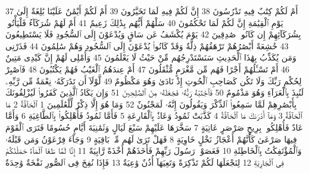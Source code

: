 {\tiny\colorbox{cl_aya}{37}} أَمْ لَكُمْ كِتَٰبٌ فِيهِ تَدْرُسُونَ
{\tiny\colorbox{cl_aya}{38}} إِنَّ لَكُمْ فِيهِ لَمَا تَخَيَّرُونَ
{\tiny\colorbox{cl_aya}{39}} أَمْ لَكُمْ أَيْمَٰنٌ عَلَيْنَا بَٰلِغَةٌ إِلَىٰ يَوْمِ ٱلْقِيَٰمَةِ إِنَّ لَكُمْ لَمَا تَحْكُمُونَ
{\tiny\colorbox{cl_aya}{40}} سَلْهُمْ أَيُّهُم بِذَٰلِكَ زَعِيمٌ
{\tiny\colorbox{cl_aya}{41}} أَمْ لَهُمْ شُرَكَآءُ فَلْيَأْتُوا۟ بِشُرَكَآئِهِمْ إِن كَانُوا۟ صَٰدِقِينَ
{\tiny\colorbox{cl_aya}{42}} يَوْمَ يُكْشَفُ عَن سَاقٍ وَيُدْعَوْنَ إِلَى ٱلسُّجُودِ فَلَا يَسْتَطِيعُونَ
{\tiny\colorbox{cl_aya}{43}} خَٰشِعَةً أَبْصَٰرُهُمْ تَرْهَقُهُمْ ذِلَّةٌ وَقَدْ كَانُوا۟ يُدْعَوْنَ إِلَى ٱلسُّجُودِ وَهُمْ سَٰلِمُونَ
{\tiny\colorbox{cl_aya}{44}} فَذَرْنِى وَمَن يُكَذِّبُ بِهَٰذَا ٱلْحَدِيثِ سَنَسْتَدْرِجُهُم مِّنْ حَيْثُ لَا يَعْلَمُونَ
{\tiny\colorbox{cl_aya}{45}} وَأُمْلِى لَهُمْ إِنَّ كَيْدِى مَتِينٌ
{\tiny\colorbox{cl_aya}{46}} أَمْ تَسْـَٔلُهُمْ أَجْرًا فَهُم مِّن مَّغْرَمٍ مُّثْقَلُونَ
{\tiny\colorbox{cl_aya}{47}} أَمْ عِندَهُمُ ٱلْغَيْبُ فَهُمْ يَكْتُبُونَ
{\tiny\colorbox{cl_aya}{48}} فَٱصْبِرْ لِحُكْمِ رَبِّكَ وَلَا تَكُن كَصَاحِبِ ٱلْحُوتِ إِذْ نَادَىٰ وَهُوَ مَكْظُومٌ
{\tiny\colorbox{cl_aya}{49}} لَّوْلَآ أَن تَدَٰرَكَهُۥ نِعْمَةٌ مِّن رَّبِّهِۦ لَنُبِذَ بِٱلْعَرَآءِ وَهُوَ مَذْمُومٌ
{\tiny\colorbox{cl_aya}{50}} فَٱجْتَبَٰهُ رَبُّهُۥ فَجَعَلَهُۥ مِنَ ٱلصَّٰلِحِينَ
{\tiny\colorbox{cl_aya}{51}} وَإِن يَكَادُ ٱلَّذِينَ كَفَرُوا۟ لَيُزْلِقُونَكَ بِأَبْصَٰرِهِمْ لَمَّا سَمِعُوا۟ ٱلذِّكْرَ وَيَقُولُونَ إِنَّهُۥ لَمَجْنُونٌ
{\tiny\colorbox{cl_aya}{52}} وَمَا هُوَ إِلَّا ذِكْرٌ لِّلْعَٰلَمِينَ
{\tiny\colorbox{cl_aya}{1}} ٱلْحَآقَّةُ
{\tiny\colorbox{cl_aya}{2}} مَا ٱلْحَآقَّةُ
{\tiny\colorbox{cl_aya}{3}} وَمَآ أَدْرَىٰكَ مَا ٱلْحَآقَّةُ
{\tiny\colorbox{cl_aya}{4}} كَذَّبَتْ ثَمُودُ وَعَادٌۢ بِٱلْقَارِعَةِ
{\tiny\colorbox{cl_aya}{5}} فَأَمَّا ثَمُودُ فَأُهْلِكُوا۟ بِٱلطَّاغِيَةِ
{\tiny\colorbox{cl_aya}{6}} وَأَمَّا عَادٌ فَأُهْلِكُوا۟ بِرِيحٍ صَرْصَرٍ عَاتِيَةٍ
{\tiny\colorbox{cl_aya}{7}} سَخَّرَهَا عَلَيْهِمْ سَبْعَ لَيَالٍ وَثَمَٰنِيَةَ أَيَّامٍ حُسُومًا فَتَرَى ٱلْقَوْمَ فِيهَا صَرْعَىٰ كَأَنَّهُمْ أَعْجَازُ نَخْلٍ خَاوِيَةٍ
{\tiny\colorbox{cl_aya}{8}} فَهَلْ تَرَىٰ لَهُم مِّنۢ بَاقِيَةٍ
{\tiny\colorbox{cl_aya}{9}} وَجَآءَ فِرْعَوْنُ وَمَن قَبْلَهُۥ وَٱلْمُؤْتَفِكَٰتُ بِٱلْخَاطِئَةِ
{\tiny\colorbox{cl_aya}{10}} فَعَصَوْا۟ رَسُولَ رَبِّهِمْ فَأَخَذَهُمْ أَخْذَةً رَّابِيَةً
{\tiny\colorbox{cl_aya}{11}} إِنَّا لَمَّا طَغَا ٱلْمَآءُ حَمَلْنَٰكُمْ فِى ٱلْجَارِيَةِ
{\tiny\colorbox{cl_aya}{12}} لِنَجْعَلَهَا لَكُمْ تَذْكِرَةً وَتَعِيَهَآ أُذُنٌ وَٰعِيَةٌ
{\tiny\colorbox{cl_aya}{13}} فَإِذَا نُفِخَ فِى ٱلصُّورِ نَفْخَةٌ وَٰحِدَةٌ
